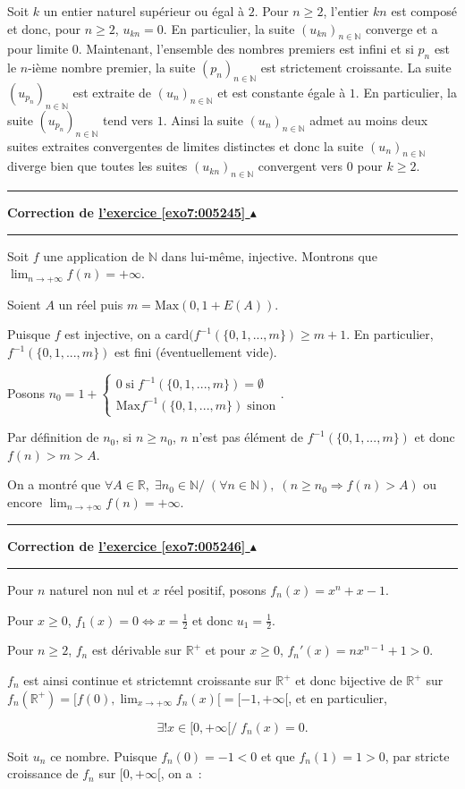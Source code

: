 \documentclass[11pt,a4paper]{article}
\newcommand{\Nn}{\mathbb{N}} \newcommand{\N}{\mathbb{N}}
\newcommand{\Rr}{\mathbb{R}} \newcommand{\R}{\mathbb{R}}
\newcounter{exo}
\newcommand{\correction}[1]{\hypertarget{cor7:#1}{}\label{cor7:#1}{\bf Correction de \hyperlink{exo7:#1}{l'exercice \ref{exo7:#1} $\blacktriangle$}}\vspace{1mm}\hrule\vspace{1mm}}
\newcommand{\fincorrection}{\vspace{1mm}\hrule\vspace*{7mm}}
\begin{document}
Soit $k$ un entier naturel supérieur ou égal à $2$. Pour $n\geq2$, l'entier $kn$ est composé et donc, pour $n\geq 2$, $u_{kn}=0$. En particulier, la suite $(u_{kn})_{n\in\Nn}$ converge et a pour limite $0$. Maintenant, l'ensemble des nombres premiers est infini et si $p_n$ est le $n$-ième nombre premier, la suite $(p_n)_{n\in\Nn}$ est strictement croissante. La suite $(u_{p_n})_{n\in\Nn}$ est extraite de $(u_n)_{n\in\Nn}$ et est constante égale à $1$. En particulier, la suite $(u_{p_n})_{n\in\Nn}$ tend vers $1$. Ainsi la suite $(u_n)_{n\in\Nn}$ admet au moins deux suites extraites convergentes de limites distinctes et donc la suite $(u_n)_{n\in\Nn}$ diverge bien que toutes les suites $(u_{kn})_{n\in\Nn}$ convergent vers $0$ pour $k\geq2$.
\fincorrection
\correction{005245}
Soit $f$ une application de $\Nn$ dans lui-même, injective. Montrons que $\lim_{n\rightarrow +\infty}f(n)=+\infty$.

Soient $A$ un réel puis $m=\mbox{Max}(0,1+E(A))$.

Puisque $f$ est injective, on a $\mbox{card}(f^{-1}(\{0,1,...,m\})\geq m+1$. En particulier, $f^{-1}(\{0,1,...,m\})$ est fini (éventuellement vide).

Posons $n_0=1+\left\{
\begin{array}{l}
0\;\mbox{si}\;f^{-1}(\{0,1,...,m\})=\emptyset\\
\mbox{Max}f^{-1}(\{0,1,...,m\})\;\mbox{sinon}
\end{array}
\right.$.

Par définition de $n_0$, si $n\geq n_0$, $n$ n'est pas élément de $f^{-1}(\{0,1,...,m\})$ et donc $f(n)>m>A$.

On a montré que $\forall A\in\Rr,\;\exists n_0\in\Nn/\;(\forall n\in\Nn),\;(n\geq n_0\Rightarrow f(n)>A)$ ou encore 
$\lim_{n\rightarrow +\infty}f(n)=+\infty$.

\fincorrection
\correction{005246}
Pour $n$ naturel non nul et $x$ réel positif, posons $f_n(x)=x^n+x-1$.

Pour $x\geq0$, $f_1(x)=0\Leftrightarrow x=\frac{1}{2}$ et donc $u_1=\frac{1}{2}$.

Pour $n\geq2$, $f_n$ est dérivable sur $\Rr^+$ et pour $x\geq 0$, $f_n'(x)=nx^{n-1}+1>0$.

$f_n$ est ainsi continue et strictemnt croissante sur $\Rr^+$ et donc bijective de $\Rr^+$ sur $f_n(\Rr^+)=[f(0),\lim_{x\rightarrow +\infty}f_n(x)[=[-1,+\infty[$, et en particulier,

$$\exists!x\in[0,+\infty[/\;f_n(x)=0.$$

Soit $u_n$ ce nombre. Puisque $f_n(0)=-1<0$ et que $f_n(1)=1>0$, par stricte croissance de $f_n$ sur $[0,+\infty[$, on a~:
\end{document}
